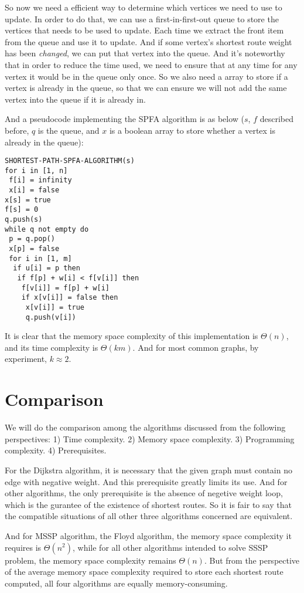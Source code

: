 \documentclass[a4paper,11pt,twocolumn]{article}
\begin{document}
So now we need a efficient way to determine which vertices we need to use to update. In order to do that, we can use a first-in-first-out queue to store the vertices that needs to be used to update. Each time we extract the front item from the queue and use it to update. And if some vertex's shortest route weight has been \emph{changed}, we can put that vertex into the queue. And it's noteworthy that in order to reduce the time used, we need to ensure that at any time for any vertex it would be in the queue only once. So we also need a array to store if a vertex is already in the queue, so that we can ensure we will not add the same vertex into the queue if it is already in.

And a pseudocode implementing the SPFA algorithm is as below ($s$, $f$ described before, $q$ is the queue, and $x$ is a boolean array to store whether a vertex is already in the queue):

\begin{verbatim}
SHORTEST-PATH-SPFA-ALGORITHM(s)
for i in [1, n]
 f[i] = infinity
 x[i] = false
x[s] = true
f[s] = 0
q.push(s)
while q not empty do
 p = q.pop()
 x[p] = false
 for i in [1, m]
  if u[i] = p then
   if f[p] + w[i] < f[v[i]] then
    f[v[i]] = f[p] + w[i]
    if x[v[i]] = false then
     x[v[i]] = true
     q.push(v[i])
\end{verbatim}

It is clear that the memory space complexity of this implementation is $\Theta(n)$, and its time complexity is $\Theta(km)$. And for most common graphs, by experiment, $k\approx 2$.

\section{Comparison}

We will do the comparison among the algorithms discussed from the following perspectives: 1) Time complexity. 2) Memory space complexity. 3) Programming complexity. 4) Prerequisites.

For the Dijkstra algorithm, it is necessary that the given graph must contain no edge with negative weight. And this prerequisite greatly limits its use. And for other algorithms, the only prerequisite is the absence of negetive weight loop, which is the gurantee of the existence of shortest routes. So it is fair to say that the compatible situations of all other three algorithms concerned are equivalent.

And for MSSP algorithm, the Floyd algorithm, the memory space complexity it requires is $\Theta(n^2)$, while for all other algorithms intended to solve SSSP problem, the memory space complexity remains $\Theta(n)$. But from the perspective of the average memory space complexity required to store each shortest route computed, all four algorithms are equally memory-consuming.
\end{document}

